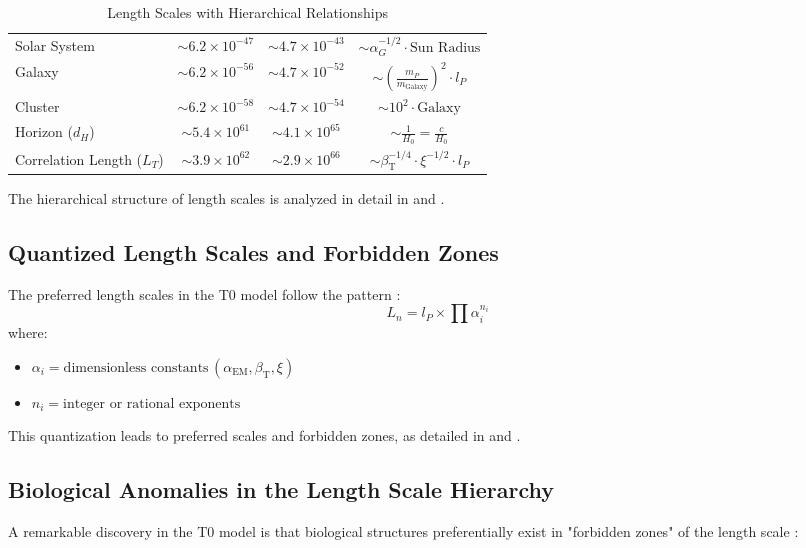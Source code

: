 \documentclass[12pt,a4paper]{article}
\newcommand{\alphaEM}{\alpha_{\text{EM}}}
\newcommand{\betaT}{\beta_{\text{T}}}
\begin{document}
\begin{table}[H]
\begin{adjustbox}{width=\textwidth}
\begin{tabular}{lccc}
				Solar System & \(\sim 6.2 \times 10^{-47}\) & \(\sim 4.7 \times 10^{-43}\) & \(\sim \alpha_G^{-1/2} \cdot \text{Sun Radius}\) \\
				Galaxy & \(\sim 6.2 \times 10^{-56}\) & \(\sim 4.7 \times 10^{-52}\) & \(\sim \left(\frac{m_P}{m_{\mathrm{Galaxy}}}\right)^2 \cdot l_P\) \\
				Cluster & \(\sim 6.2 \times 10^{-58}\) & \(\sim 4.7 \times 10^{-54}\) & \(\sim 10^2 \cdot \text{Galaxy}\) \\
				Horizon (\(d_H\)) & \(\sim 5.4 \times 10^{61}\) & \(\sim 4.1 \times 10^{65}\) & \(\sim \frac{1}{H_0} = \frac{c}{H_0}\) \\
				Correlation Length (\(L_T\)) & \(\sim 3.9 \times 10^{62}\) & \(\sim 2.9 \times 10^{66}\) & \(\sim \betaT^{-1/4} \cdot \xi^{-1/2} \cdot l_P\) \\
				\bottomrule
			\end{tabular}
		\end{adjustbox}
		\caption{Length Scales with Hierarchical Relationships}
		\label{tab:length_scales}
	\end{table}
	
	The hierarchical structure of length scales is analyzed in detail in \cite{pascher_galaxies_2025} and \cite{pascher_nateinhsystem_2025}.
	
	\subsection*{Quantized Length Scales and Forbidden Zones}
	
	The preferred length scales in the T0 model follow the pattern \cite{pascher_planck_2025}:
	\[
	L_n = l_P \times \prod \alpha_i^{n_i}
	\]
	where:
	\begin{itemize}
		\item \(\alpha_i = \text{dimensionless constants} \, (\alphaEM, \betaT, \xi)\)
		\item \(n_i = \text{integer or rational exponents}\)
	\end{itemize}
	
	This quantization leads to preferred scales and forbidden zones, as detailed in \cite{pascher_planck_2025} and \cite{pascher_quantum_2025}.
	
	\subsection*{Biological Anomalies in the Length Scale Hierarchy}
	
	A remarkable discovery in the T0 model is that biological structures preferentially exist in "forbidden zones" of the length scale \cite{pascher_quantum_2025, pascher_bio_2025}:
	
\end{document}
